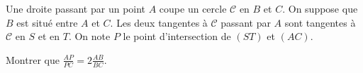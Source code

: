 Une droite passant par un point $A$ coupe un cercle $\mathcal{C}$ en $B$ et $C$. On suppose que $B$ est situé entre $A$ et $C$. Les deux tangentes à $\mathcal{C}$ passant par $A$ sont tangentes à $\mathcal{C}$ en $S$ et en $T$. On note $P$ le point d'intersection de $(ST)$ et $(AC)$.

Montrer que $\frac{AP}{PC} = 2\frac{AB}{BC}$.